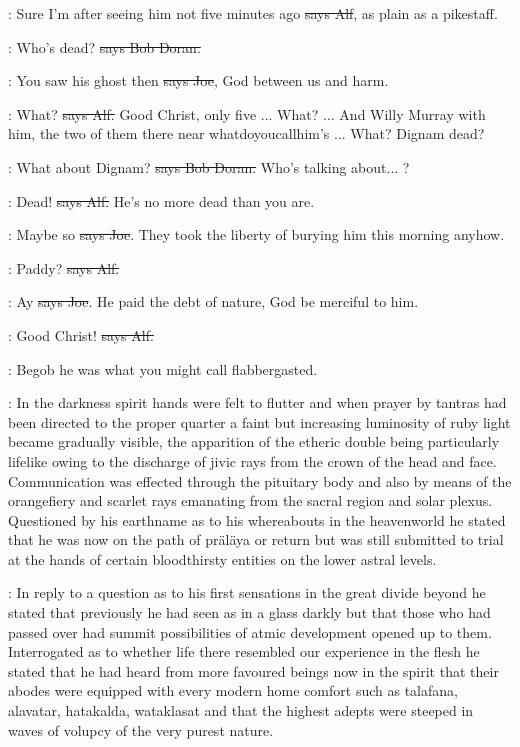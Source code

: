 \bergan:
Sure I'm after seeing him not five minutes ago
\sout{says Alf}, as plain as a pikestaff.

\doran:
Who's dead? \sout{says Bob Doran.}

\joe:
You saw his ghost then \sout{says Joe},
God between us and harm.

\bergan:
What? \sout{says Alf.} Good Christ, only five ...
What? ... And Willy Murray
with him, the two of them there near whatdoyoucallhim's ... What?
Dignam dead?

\doran:
What about Dignam? \sout{says Bob Doran.}
Who's talking about... ?

\bergan:
Dead! \sout{says Alf.}
He's no more dead than you are.

\joe:
Maybe so \sout{says Joe}.
They took the liberty of burying him this morning
anyhow.

\bergan:
Paddy? \sout{says Alf.}

\joe:
Ay \sout{says Joe}.
He paid the debt of nature, God be merciful to him.

\bergan:
Good Christ! \sout{says Alf.}

\Nq:
Begob he was what you might call flabbergasted.

:
In the darkness spirit hands were felt to flutter and when prayer by
tantras had been directed to the proper quarter a faint but increasing
luminosity of ruby light became gradually visible, the apparition of the
etheric double being particularly lifelike owing to the discharge of jivic
rays from the crown of the head and face. Communication was effected
through the pituitary body and also by means of the orangefiery and
scarlet rays emanating from the sacral region and solar plexus. Questioned
by his earthname as to his whereabouts in the heavenworld he stated that
he was now on the path of präläya or return but was still submitted to
trial at the hands of certain bloodthirsty entities on the lower astral
levels.

:
In reply to a question as to his first sensations in the great
divide beyond he stated that previously he had seen as in a glass darkly
but that those who had passed over had summit possibilities of atmic
development opened up to them. Interrogated as to whether life there
resembled our experience in the flesh he stated that he had heard from
more favoured beings now in the spirit that their abodes were equipped
with every modern home comfort such as talafana, alavatar, hatakalda,
wataklasat and that the highest adepts were steeped in waves of volupcy
of the very purest nature.

